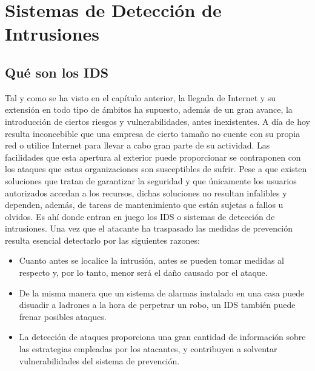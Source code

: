 
\chapter{Sistemas de Detección de Intrusiones} %

\label{Chapter2} %


\section{Qué son los IDS}
Tal y como se ha visto en el capítulo anterior, la llegada de Internet y su extensión en todo tipo de ámbitos ha supuesto, además de un gran avance, la introducción de ciertos riesgos y vulnerabilidades, antes inexistentes. A día de hoy resulta inconcebible que una empresa de cierto tamaño no cuente con su propia red o utilice Internet para llevar a cabo gran parte de su actividad. Las facilidades que esta apertura al exterior puede proporcionar se contraponen con los ataques que estas organizaciones son susceptibles de sufrir. Pese a que existen soluciones que tratan de garantizar la seguridad y que únicamente los usuarios autorizados accedan a los recursos, dichas soluciones no resultan infalibles y dependen, además, de tareas de mantenimiento que están sujetas a fallos u olvidos. Es ahí donde entran en juego los IDS o  sistemas de detección de intrusiones\cite{Kemmerer}.
Una vez que el atacante ha traspasado las medidas de prevención resulta esencial detectarlo por las siguientes razones:
\begin{itemize}
	\item Cuanto antes se localice la intrusión, antes se pueden tomar medidas al respecto y, por lo tanto, menor será el daño causado por el ataque.
	\item De la misma manera que un sistema de alarmas instalado en una casa puede disuadir a ladrones a la hora de perpetrar un robo, un IDS también puede frenar posibles ataques.
	\item La detección de ataques proporciona una gran cantidad de información sobre las estrategias empleadas por los atacantes, y contribuyen a solventar vulnerabilidades del sistema de prevención.
\end{itemize}
